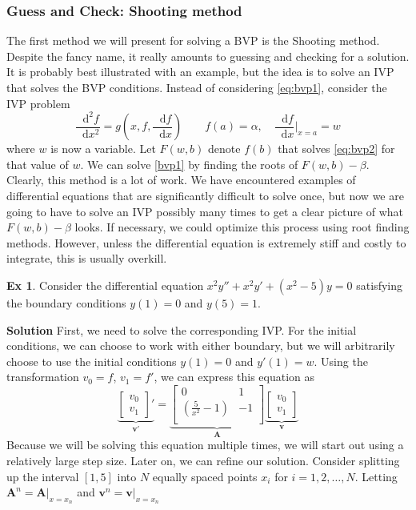 \documentclass[]{article}
\theoremstyle{definition}
\newtheorem{exmp}{Ex}[section]
\newcommand*\diff{\mathop{}\!\mathrm{d}}
\numberwithin{equation}{section}
\begin{document}
\subsubsection{Guess and Check: Shooting method }
The first method we will present for solving a BVP is the Shooting method. Despite the fancy name, it really amounts to guessing and checking for a solution. It is probably best illustrated with an example, but the idea is to solve an IVP that solves the BVP conditions. Instead of considering \eqref{eq:bvp1}, consider the IVP problem
\begin{equation}
	\frac{\diff^2 f}{\diff x^2} = g \left(x, f, \frac{\diff f}{\diff x}\right) \qquad f(a) = \alpha, \quad \frac{\diff f}{\diff x}\Big|_{x=a} = w  \label{eq:bvp2}
\end{equation}
where $w$ is now a variable. Let $F(w,b)$ denote $f(b)$ that solves \eqref{eq:bvp2} for that value of $w$. We can solve \eqref{bvp1} by finding the roots of $F(w,b) - \beta$. Clearly, this method is a lot of work. We have encountered examples of differential equations that are significantly difficult to solve once, but now we are going to have to solve an IVP possibly many times to get a clear picture of what $F(w,b) - \beta$ looks. If necessary, we could optimize this process using root finding methods. However, unless the differential equation is extremely stiff and costly to integrate, this is usually overkill.
\begin{exmp}
	Consider the differential equation $x^2 y'' + x^2y' + (x^2-5)y = 0 $ satisfying the boundary conditions $y(1) = 0$ and $y(5) = 1$.
\end{exmp}
\textbf{Solution} First, we need to solve the corresponding IVP. For the initial conditions, we can choose to work with either boundary, but we will arbitrarily choose to use the initial conditions $y(1) = 0$ and $y'(1) = w$. Using the transformation $v_0 = f$, $v_1 = f'$, we can express this equation as
\[\underbrace{
\begin{bmatrix}
v_0 \\
v_1
\end{bmatrix}'}_{\mathbf{v}'} = \underbrace{\begin{bmatrix}
0 & 1 \\
\left(\frac{5}{x^2} - 1\right) & -1 \\
\end{bmatrix}}_{\mathbf{A}} \underbrace{\begin{bmatrix}
v_0 \\
v_1
\end{bmatrix}}_{\mathbf{v}}
\] Because we will be solving this equation multiple times, we will start out using a relatively large step size. Later on, we can refine our solution. Consider splitting up the interval $[1,5]$ into $N$ equally spaced points $x_i$ for $i=1,2,\dots,N$. Letting $\mathbf{A}^n = \mathbf{A}|_{x=x_n}$ and $\mathbf{v}^n=\mathbf{v}|_{x=x_n}$
\end{document}
